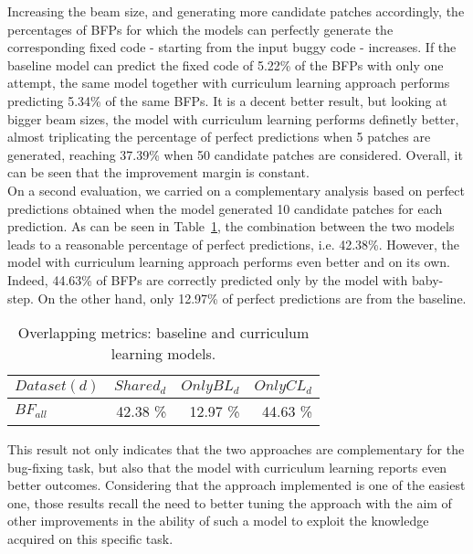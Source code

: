 Increasing the beam size, and generating more candidate patches accordingly,
the percentages of BFPs for which the models can perfectly generate the corresponding
fixed code - starting from the input buggy code - increases. If the baseline model can predict
the fixed code of 5.22\% of the BFPs with only one attempt, the same model together with 
curriculum learning approach performs predicting 5.34\% of the same BFPs. It is a decent 
better result,
but looking at bigger beam sizes, the model with curriculum learning performs 
definetly better, almost triplicating the percentage of perfect predictions when 5 patches are generated,
reaching 37.39\% when 50 candidate patches are considered. Overall, it can be seen that
the improvement margin is constant.\\
On a second evaluation, we carried on a complementary analysis based on perfect predictions
obtained when the model generated 10 candidate patches for each prediction. 
As can be seen 
in Table~\ref{table:pp_bugfixing_overlap}, the combination between the two models 
leads to a reasonable percentage of perfect predictions, i.e. 42.38\%. However, the model 
with curriculum learning approach performs even better and on its own. Indeed, 44.63\% of BFPs are correctly predicted
only by the model with baby-step. On the other hand, only 12.97\% of perfect predictions are from the baseline.
\begin{table}[h!]
    \centering
    \begin{tabular}{l|r|r|r}
    \(Dataset (d)\) & \(Shared_d\) & \(OnlyBL_d\) & \(OnlyCL_d\)\\ [0.5ex]
    \hline 
    \(BF_{all}\) & 42.38 \% & 12.97 \% & 44.63 \%\\  [1ex]
    \end{tabular}
    \caption{Overlapping metrics: baseline and curriculum learning models.}
    \label{table:pp_bugfixing_overlap}
\end{table}
This result not only indicates that the two approaches are complementary for
the bug-fixing task, but also that the model with curriculum learning reports even 
better outcomes. Considering that the approach implemented is one of the easiest one,
those results recall the need to better tuning the approach with the aim of 
other improvements in the ability of such a model to exploit the knowledge acquired on 
this specific task. 

